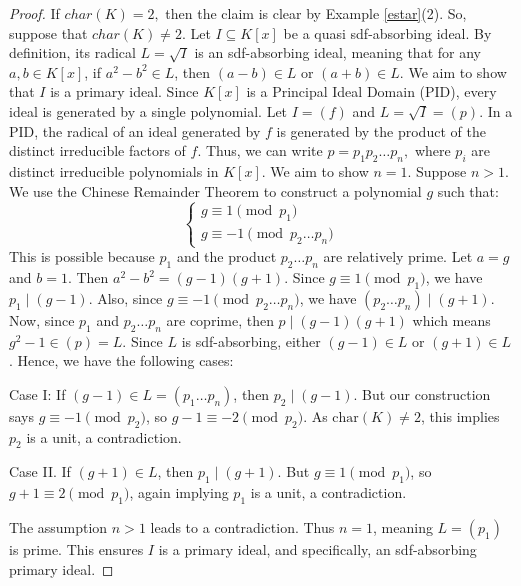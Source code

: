 \documentclass{amsart}%
\begin{document}
\begin{proof}
If $char(K)=2,$ then the claim is clear by Example \ref{estar}(2). So, suppose
that $char(K)\neq2$. Let $I\subseteq K[x]$ be a quasi sdf-absorbing ideal. By
definition, its radical $L=\sqrt{I}$ is an sdf-absorbing ideal, meaning that
for any $a,b\in K[x]$, if $a^{2}-b^{2}\in L$, then $(a-b)\in L$ or $(a+b)\in
L$. We aim to show that $I$ is a primary ideal. \newline Since $K[x]$ is a
Principal Ideal Domain (PID), every ideal is generated by a single polynomial.
Let $I=(f)$ and $L=\sqrt{I}=(p)$. In a PID, the radical of an ideal generated
by $f$ is generated by the product of the distinct irreducible factors of $f$.
Thus, we can write $p=p_{1}p_{2}\dots p_{n},$ where $p_{i}$ are distinct
irreducible polynomials in $K[x]$. We aim to show $n=1$. Suppose $n>1$. We use
the Chinese Remainder Theorem to construct a polynomial $g$ such that:%
\[%
\begin{cases}
g\equiv1\pmod{p_1}\\
g\equiv-1\pmod{p_2 \dots p_n}
\end{cases}
\]
This is possible because $p_{1}$ and the product $p_{2}\dots p_{n}$ are
relatively prime. Let $a=g$ and $b=1$. Then $a^{2}-b^{2}=(g-1)(g+1)$. Since
$g\equiv1\pmod{p_1}$, we have $p_{1}\mid(g-1)$. Also, since $g\equiv
-1\pmod{p_2 \dots p_n}$, we have $(p_{2}\dots p_{n})\mid(g+1)$. Now, since
$p_{1}$ and $p_{2}\dots p_{n}$ are coprime, then $p\mid(g-1)(g+1)$ which means
$g^{2}-1\in(p)=L.$ Since $L$ is sdf-absorbing, either $(g-1)\in L$ or
$(g+1)\in L$. Hence, we have the following cases:

Case I: If $(g-1)\in L=(p_{1}\dots p_{n})$, then $p_{2}\mid(g-1)$. But our
construction says $g\equiv-1\pmod{p_2}$, so $g-1\equiv-2\pmod{p_2}$. As
$\text{char}(K)\neq2$, this implies $p_{2}$ is a unit, a contradiction.

Case II. If $(g+1)\in L$, then $p_{1}\mid(g+1)$. But $g\equiv1\pmod{p_1}$, so
$g+1\equiv2\pmod{p_1}$, again implying $p_{1}$ is a unit, a contradiction.

The assumption $n>1$ leads to a contradiction. Thus $n=1$, meaning $L=(p_{1})$
is prime. This ensures $I$ is a primary ideal, and specifically, an
sdf-absorbing primary ideal.
\end{proof}
\end{document}
